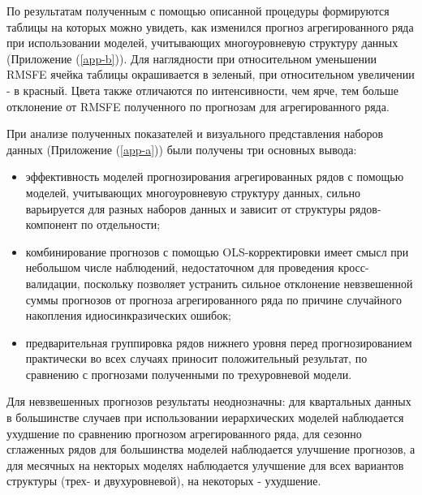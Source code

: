 \documentclass[12pt,a4paper, oneside]{extreport}
\begin{document}
По результатам полученным с помощью   описанной процедуры формируются таблицы на которых можно  увидеть, как изменился прогноз агрегированного ряда при использовании моделей, учитывающих многоуровневую  структуру данных (Приложение (\ref{app-b})). Для наглядности при относительном уменьшении RMSFE ячейка таблицы окрашивается в зеленый, при относительном увеличении - в красный. Цвета также отличаются по интенсивности, чем ярче, тем больше отклонение от RMSFE полученного по прогнозам для агрегированного ряда.

При анализе  полученных показателей  и визуального  представления  наборов данных (Приложение (\ref{app-a}))  были получены три основных  вывода:


\begin{itemize}
	\item эффективность  моделей прогнозирования  агрегированных рядов с помощью моделей, учитывающих многоуровневую структуру данных,  сильно варьируется для разных наборов данных и зависит от структуры рядов-компонент   по отдельности;
	\item комбинирование прогнозов с помощью OLS-корректировки  имеет смысл при небольшом числе наблюдений, недостаточном для проведения кросс-валидации, поскольку позволяет устранить сильное отклонение невзвешенной суммы прогнозов от прогноза агрегированного ряда по причине случайного накопления идиосинкразических ошибок;
	\item     предварительная группировка рядов нижнего уровня перед прогнозированием практически во всех случаях приносит положительный результат, по сравнению с прогнозами полученными по трехуровневой модели. 
\end{itemize}







Для невзвешенных прогнозов результаты неоднозначны: для квартальных данных в большинстве случаев при использовании иерархических моделей наблюдается ухудшение  по сравнению прогнозом агрегированного ряда, для сезонно сглаженных рядов для большинства моделей наблюдается улучшение прогнозов, а для месячных на некторых моделях наблюдается улучшение для всех вариантов структуры (трех- и двухуровневой),   на некоторых - ухудшение.
 
\end{document}
